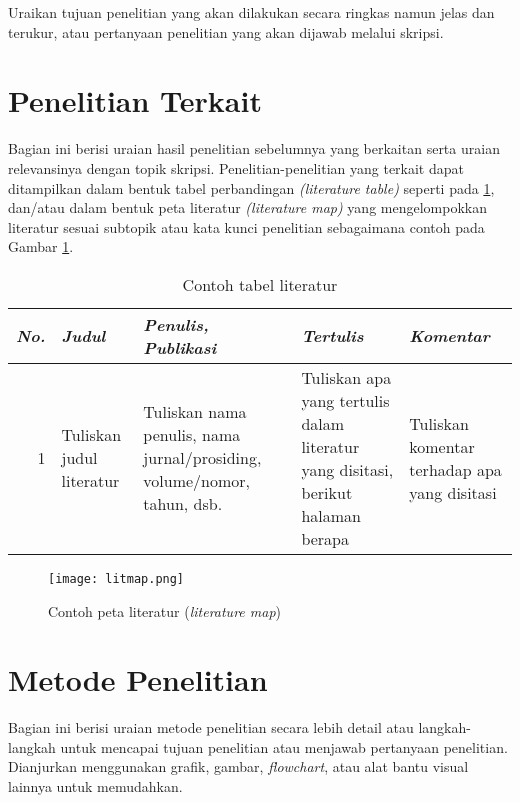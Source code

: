 \documentclass[conference, a4paper]{IEEEtran_ID}
\begin{document}
	Uraikan tujuan penelitian yang akan dilakukan secara ringkas namun jelas dan terukur, atau pertanyaan penelitian yang akan dijawab melalui skripsi.

\section{Penelitian Terkait}

	Bagian ini berisi uraian hasil penelitian sebelumnya yang berkaitan serta uraian relevansinya dengan topik skripsi. Penelitian-penelitian yang terkait dapat ditampilkan dalam bentuk tabel perbandingan \textit{(literature table)} seperti pada \ref{lit_table}, dan/atau dalam bentuk peta literatur \textit{(literature map)} yang mengelompokkan literatur sesuai subtopik atau kata kunci penelitian sebagaimana contoh pada Gambar \ref{lit_map}.

	\begin{table}[htbp]
		\caption{Contoh tabel literatur}
		\begin{center}
		\begin{tabular}{|r|p{1.5cm}|p{1.8cm}|p{1.5cm}|p{1.5cm}|}
			\hline
			\textbf{\textit{No.}} & \textbf{\textit{Judul}} & \textbf{\textit{Penulis, Publikasi}} & \textbf{\textit{Tertulis}} & \textbf{\textit{Komentar}} \\
			\hline
			1 & Tuliskan judul literatur & Tuliskan nama penulis, nama 
			jurnal/prosiding, volume/nomor, tahun, dsb. & Tuliskan apa yang 
			tertulis dalam literatur yang disitasi, berikut halaman berapa & %
			Tuliskan komentar terhadap apa yang disitasi \\[2ex]
			\hline
		\end{tabular}
		\label{lit_table}
		\end{center}
	\end{table}

	\begin{figure}[htbp]
		\centerline{\texttt{[image: litmap.png]}}
		\caption{Contoh peta literatur (\textit{literature map})}
		\label{lit_map}
	\end{figure}

\section{Metode Penelitian}

	Bagian ini berisi uraian metode penelitian secara lebih detail atau langkah-langkah untuk mencapai tujuan penelitian atau menjawab pertanyaan penelitian. Dianjurkan menggunakan grafik, gambar, \textit{flowchart}, atau alat bantu visual lainnya untuk memudahkan.
\end{document}
